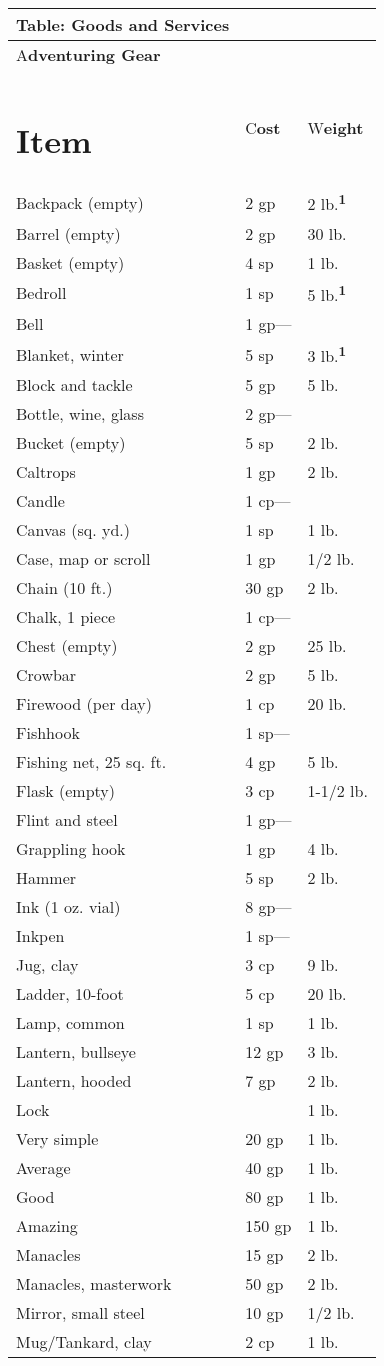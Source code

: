 \documentclass{article}
\begin{document}
\begin{tabular}{|>{\raggedright}p{182pt}|>{\raggedright}p{44pt}|>{\raggedright}p{40pt}|}
\hline
T\textbf{able: Goods and Services} &  & \tabularnewline
\hline
A\textbf{dventuring Gear} &  & \tabularnewline
\hline
\section*{I\textbf{tem}} & C\textbf{ost} & W\textbf{eight}\tabularnewline
\hline
Backpack (empty) & 2 gp & 2 lb.\textsuperscript{\textbf{1}}\tabularnewline
\hline
Barrel (empty) & 2 gp & 30 lb.\tabularnewline
\hline
Basket (empty) & 4 sp & 1 lb.\tabularnewline
\hline
Bedroll & 1 sp & 5 lb.\textsuperscript{\textbf{1}}\tabularnewline
\hline
Bell & 1 gp--- & \tabularnewline
\hline
Blanket, winter & 5 sp & 3 lb.\textsuperscript{\textbf{1}}\tabularnewline
\hline
Block and tackle & 5 gp & 5 lb.\tabularnewline
\hline
Bottle, wine, glass & 2 gp--- & \tabularnewline
\hline
Bucket (empty) & 5 sp & 2 lb.\tabularnewline
\hline
Caltrops & 1 gp & 2 lb.\tabularnewline
\hline
Candle & 1 cp--- & \tabularnewline
\hline
Canvas (sq. yd.) & 1 sp & 1 lb.\tabularnewline
\hline
Case, map or scroll & 1 gp & 1/2 lb.\tabularnewline
\hline
Chain (10 ft.) & 30 gp & 2 lb.\tabularnewline
\hline
Chalk, 1 piece & 1 cp--- & \tabularnewline
\hline
Chest (empty) & 2 gp & 25 lb.\tabularnewline
\hline
Crowbar & 2 gp & 5 lb.\tabularnewline
\hline
Firewood (per day) & 1 cp & 20 lb.\tabularnewline
\hline
Fishhook & 1 sp--- & \tabularnewline
\hline
Fishing net, 25 sq. ft. & 4 gp & 5 lb.\tabularnewline
\hline
Flask (empty) & 3 cp & 1-1/2 lb.\tabularnewline
\hline
Flint and steel & 1 gp--- & \tabularnewline
\hline
Grappling hook & 1 gp & 4 lb.\tabularnewline
\hline
Hammer & 5 sp & 2 lb.\tabularnewline
\hline
Ink (1 oz. vial) & 8 gp--- & \tabularnewline
\hline
Inkpen & 1 sp--- & \tabularnewline
\hline
Jug, clay & 3 cp & 9 lb.\tabularnewline
\hline
Ladder, 10-foot & 5 cp & 20 lb.\tabularnewline
\hline
Lamp, common & 1 sp & 1 lb.\tabularnewline
\hline
Lantern, bullseye & 12 gp & 3 lb.\tabularnewline
\hline
Lantern, hooded & 7 gp & 2 lb.\tabularnewline
\hline
Lock &   & 1 lb.\tabularnewline
\hline
Very simple & 20 gp & 1 lb.\tabularnewline
\hline
Average & 40 gp & 1 lb.\tabularnewline
\hline
Good & 80 gp & 1 lb.\tabularnewline
\hline
Amazing & 150 gp & 1 lb.\tabularnewline
\hline
Manacles & 15 gp & 2 lb.\tabularnewline
\hline
Manacles, masterwork & 50 gp & 2 lb.\tabularnewline
\hline
Mirror, small steel & 10 gp & 1/2 lb.\tabularnewline
\hline
Mug/Tankard, clay & 2 cp & 1 lb.\tabularnewline
\hline

\end{tabular}
\end{document}
